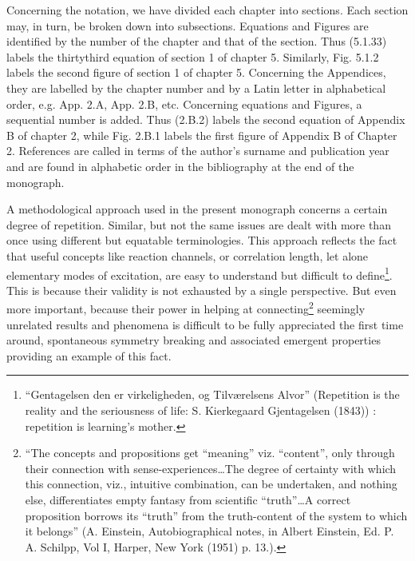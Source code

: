 Concerning the notation, we have divided each chapter into sections. Each section may, in turn, be broken down into subsections. Equations and Figures are identified by the number of the chapter and that of the section. Thus (5.1.33) labels the thirtythird equation of section 1 of chapter 5. Similarly, Fig. 5.1.2 labels the second figure of section 1 of chapter 5. Concerning the Appendices, they are labelled by the chapter number and by a Latin letter in alphabetical order, e.g. App. 2.A, App. 2.B, etc. Concerning equations and Figures, a sequential number is added. Thus (2.B.2) labels the second equation of Appendix B of chapter 2, while Fig. 2.B.1 labels the first figure of Appendix B of Chapter 2. References are called  in terms of the author's surname and publication year and are found in alphabetic order in the bibliography at the end of the monograph.

A methodological approach used in the present monograph concerns a certain degree of repetition. Similar, but not the same issues are dealt with more than once using different but equatable terminologies. This approach reflects the fact that useful concepts like reaction channels, or correlation length, let alone elementary modes of excitation, are easy to understand but difficult to define\footnote{\label{f10}``Gentagelsen den er virkeligheden, og Tilv\ae{}relsens Alvor'' (Repetition is the reality and the seriousness of life: S. Kierkegaard Gjentagelsen (1843)) {} : repetition is learning's mother.}. This is because their validity is not exhausted by a single perspective. But even more important, because their power in helping at connecting\footnote{``The concepts and propositions get ``meaning'' viz. ``content'', only through their connection with sense-experiences\dots The degree of certainty with which this connection, viz., intuitive combination, can be undertaken, and nothing else, differentiates empty fantasy from scientific ``truth''\dots A correct proposition borrows its ``truth'' from the truth-content of the system to which it belongs'' (A. Einstein, Autobiographical notes, in Albert Einstein, Ed. P. A. Schilpp, Vol I, Harper, New York (1951) p. 13.).} seemingly unrelated results and phenomena is difficult to be fully appreciated the first time around, spontaneous symmetry breaking and associated emergent properties providing an example of this fact.

